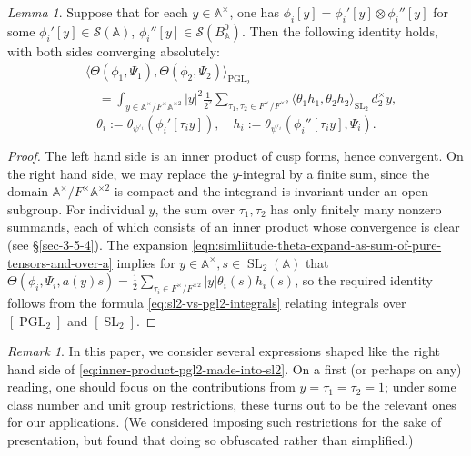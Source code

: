 \documentclass[reqno,10pt]{amsart}
\theoremstyle{plain} %
\theoremstyle{definition}
\theoremstyle{plain} %
\theoremstyle{remark}
\newtheorem*{remark*}            {Remark}
\theoremstyle{itplain} %
\newtheorem*{lemma*}{Lemma}
\theoremstyle{remark} %
\numberwithin{equation}{section}
\DeclareMathOperator{\SL}{SL}
\def\PGL{\operatorname{PGL}}
\begin{document}
\begin{lemma*}
  Suppose that for each $y \in \mathbb{A}^\times$, one has $\phi_i [y] = \phi_i '[y] \otimes \phi_i ''[y]$
  for some $\phi_i '[y] \in \mathcal{S}(\mathbb{A})$, $\phi_i ''[y] \in \mathcal{S}(B_\mathbb{A}^0)$.
  Then the following identity holds, with both sides converging absolutely:
  \begin{equation}\label{eq:inner-product-pgl2-made-into-sl2}
    \begin{split}
      &\langle \Theta(\phi_1,\Psi_1),
    \Theta(\phi_2,\Psi_2) \rangle_{\PGL_2} \\
    &\quad =
    \int_{y \in \mathbb{A}^\times / F^\times \mathbb{A}^{\times 2}}
    |y|^2
    \frac{1}{2^2}
    \sum_{\tau_1,\tau_2 \in F^\times / F^{\times 2}}
    \langle \theta_1 h_1, \theta_2 h_2 \rangle_{\SL_2}
    \, d_2^\times y,
  \end{split}
\end{equation}
\begin{equation}\label{eq:thet-:=-thet}
    \theta_i := \theta_{\psi^{\tau_i}}(\phi_i'[\tau_i y]), \quad h_i := \theta_{\psi^{\tau_i}}(\phi_i''[\tau_i y],\Psi_i).
  \end{equation}
\end{lemma*}
\begin{proof}
  The left hand side is an inner product of cusp forms, hence convergent.  On the right hand side, we may replace the $y$-integral by a finite sum, since the domain $\mathbb{A}^{\times} / F^{\times } \mathbb{A}^{\times 2}$ is compact and the integrand is invariant under an open subgroup.  For individual $y$, the sum over $\tau_1, \tau_2$ has only finitely many nonzero summands, each of which consists of an inner product whose convergence is clear (see \S\ref{sec-3-5-4}).  The expansion \eqref{eqn:simliitude-theta-expand-as-sum-of-pure-tensors-and-over-a} implies for $y \in \mathbb{A}^\times, s \in \SL_2(\mathbb{A})$ that $\Theta(\phi_i,\Psi_i,a(y) s) = \frac{1}{2} \sum _{\tau_i \in F^\times / F^{\times 2} } |y| \theta_i(s) h_i(s)$, so the required identity follows from the formula \eqref{eq:sl2-vs-pgl2-integrals} relating integrals over $[\PGL_2]$ and $[\SL_2]$.
\end{proof}


\begin{remark*}
  In this paper, we consider several expressions shaped like the right hand side of \eqref{eq:inner-product-pgl2-made-into-sl2}.  On a first (or perhaps on any) reading, one should focus on the contributions from $y = \tau_1 = \tau_2 = 1$; under some class number and unit group restrictions, these turns out to be the relevant ones for our applications.  (We considered imposing such restrictions for the sake of presentation, but found that doing so obfuscated rather than simplified.)
\end{remark*}
\end{document}
